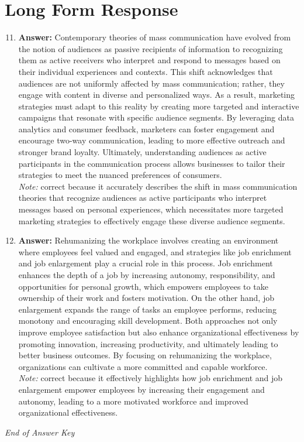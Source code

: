 \documentclass[12pt]{article}
\begin{document}
\section*{Long Form Response}
\begin{enumerate}[label=\arabic*.]
\setcounter{enumi}{10}
\item \textbf{Answer:} Contemporary theories of mass communication have evolved from the notion of audiences as passive recipients of information to recognizing them as active receivers who interpret and respond to messages based on their individual experiences and contexts. This shift acknowledges that audiences are not uniformly affected by mass communication; rather, they engage with content in diverse and personalized ways. As a result, marketing strategies must adapt to this reality by creating more targeted and interactive campaigns that resonate with specific audience segments. By leveraging data analytics and consumer feedback, marketers can foster engagement and encourage two-way communication, leading to more effective outreach and stronger brand loyalty. Ultimately, understanding audiences as active participants in the communication process allows businesses to tailor their strategies to meet the nuanced preferences of consumers.
\\ \textit{Note:} correct because it accurately describes the shift in mass communication theories that recognize audiences as active participants who interpret messages based on personal experiences, which necessitates more targeted marketing strategies to effectively engage these diverse audience segments.
\item \textbf{Answer:} Rehumanizing the workplace involves creating an environment where employees feel valued and engaged, and strategies like job enrichment and job enlargement play a crucial role in this process. Job enrichment enhances the depth of a job by increasing autonomy, responsibility, and opportunities for personal growth, which empowers employees to take ownership of their work and fosters motivation. On the other hand, job enlargement expands the range of tasks an employee performs, reducing monotony and encouraging skill development. Both approaches not only improve employee satisfaction but also enhance organizational effectiveness by promoting innovation, increasing productivity, and ultimately leading to better business outcomes. By focusing on rehumanizing the workplace, organizations can cultivate a more committed and capable workforce.
\\ \textit{Note:} correct because it effectively highlights how job enrichment and job enlargement empower employees by increasing their engagement and autonomy, leading to a more motivated workforce and improved organizational effectiveness.
\end{enumerate}

\vfill
\noindent\textit{End of Answer Key}
\end{document}
